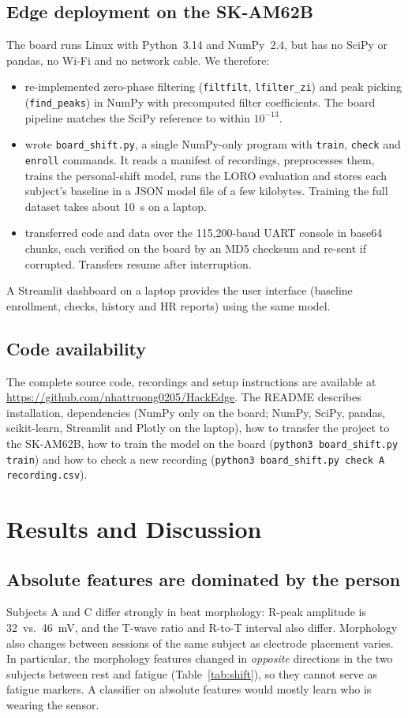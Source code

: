 \documentclass[11pt]{article}
\begin{document}
\subsection{Edge deployment on the SK-AM62B}
The board runs Linux with Python~3.14 and NumPy~2.4, but has no SciPy or pandas, no Wi-Fi and no network
cable. We therefore:
\begin{itemize}
  \item re-implemented zero-phase filtering (\texttt{filtfilt}, \texttt{lfilter\_zi}) and peak picking
  (\texttt{find\_peaks}) in NumPy with precomputed filter coefficients. The board pipeline matches the SciPy
  reference to within $10^{-13}$.
  \item wrote \texttt{board\_shift.py}, a single NumPy-only program with \texttt{train}, \texttt{check}
  and \texttt{enroll} commands. It reads a manifest of recordings, preprocesses them, trains the
  personal-shift model, runs the LORO evaluation and stores each subject's baseline in a JSON model file
  of a few kilobytes. Training the full dataset takes about 10~s on a laptop.
  \item transferred code and data over the 115{,}200-baud UART console in base64 chunks, each verified on the
  board by an MD5 checksum and re-sent if corrupted. Transfers resume after interruption.
\end{itemize}
A Streamlit dashboard on a laptop provides the user interface (baseline enrollment, checks, history and
HR reports) using the same model.

\subsection{Code availability}
The complete source code, recordings and setup instructions are available at
\url{https://github.com/nhattruong0205/HackEdge}. The README describes installation, dependencies
(NumPy only on the board; NumPy, SciPy, pandas, scikit-learn, Streamlit and Plotly on the laptop),
how to transfer the project to the SK-AM62B, how to train the model on the board
(\texttt{python3 board\_shift.py train}) and how to check a new recording
(\texttt{python3 board\_shift.py check A recording.csv}).

\section{Results and Discussion}

\subsection{Absolute features are dominated by the person}
Subjects A and C differ strongly in beat morphology: R-peak amplitude is 32~vs.\ 46~mV, and the T-wave
ratio and R-to-T interval also differ. Morphology also changes between sessions of the same subject as
electrode placement varies. In particular, the morphology features changed in \emph{opposite} directions in
the two subjects between rest and fatigue (Table~\ref{tab:shift}), so they cannot serve as fatigue markers.
A classifier on absolute features would mostly learn who is wearing the sensor.
\end{document}
